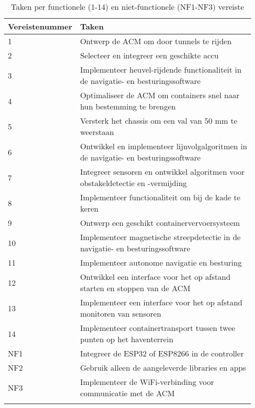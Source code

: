\begin{longtable}{@{}ll@{}}
    \toprule
    Vereistenummer & Taken                                                                               \\
    \midrule
    \endhead

    1              & Ontwerp de ACM om door tunnels te rijden                                            \\
    2              & Selecteer en integreer een geschikte accu                                           \\
    3              & Implementeer heuvel-rijdende functionaliteit in de navigatie- en besturingssoftware \\
    4              & Optimaliseer de ACM om containers snel naar hun bestemming te brengen               \\
    5              & Versterk het chassis om een val van 50 mm te weerstaan                              \\
    6              & Ontwikkel en implementeer lijnvolgalgoritmen in de navigatie- en besturingssoftware \\
    7              & Integreer sensoren en ontwikkel algoritmen voor obstakeldetectie en -vermijding     \\
    8              & Implementeer functionaliteit om bij de kade te keren                                \\
    9              & Ontwerp een geschikt containervervoersysteem                                        \\
    10             & Implementeer magnetische streepdetectie in de navigatie- en besturingssoftware      \\
    11             & Implementeer autonome navigatie en besturing                                        \\
    12             & Ontwikkel een interface voor het op afstand starten en stoppen van de ACM           \\
    13             & Implementeer een interface voor het op afstand monitoren van sensoren               \\
    14             & Implementeer containertransport tussen twee punten op het haventerrein              \\ [1ex]

    NF1            & Integreer de ESP32 of ESP8266 in de controller                                      \\
    NF2            & Gebruik alleen de aangeleverde libraries en apps                                    \\
    NF3            & Implementeer de WiFi-verbinding voor communicatie met de ACM                        \\

    \bottomrule
    \caption{Taken per functionele (1-14) en niet-functionele (NF1-NF3) vereiste}
    \label{tab:taken_per_vereiste}
\end{longtable}


